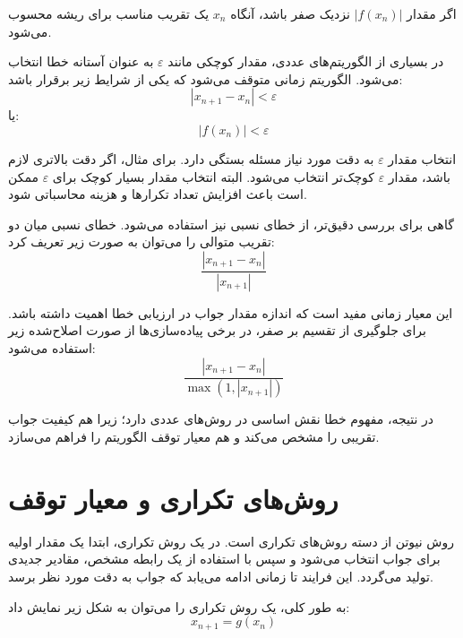 اگر مقدار $|f(x_n)|$ نزدیک صفر باشد، آنگاه $x_n$ یک تقریب مناسب برای ریشه محسوب می‌شود.

در بسیاری از الگوریتم‌های عددی، مقدار کوچکی مانند $\varepsilon$ به عنوان آستانه خطا انتخاب می‌شود. الگوریتم زمانی متوقف می‌شود که یکی از شرایط زیر برقرار باشد:
\begin{equation}
|x_{n+1}-x_n|<\varepsilon
\label{eq:ch2-stop-diff}
\end{equation}
یا:
\begin{equation}
|f(x_n)|<\varepsilon
\label{eq:ch2-stop-func}
\end{equation}

انتخاب مقدار $\varepsilon$ به دقت مورد نیاز مسئله بستگی دارد. برای مثال، اگر دقت بالاتری لازم باشد، مقدار $\varepsilon$ کوچک‌تر انتخاب می‌شود. البته انتخاب مقدار بسیار کوچک برای $\varepsilon$ ممکن است باعث افزایش تعداد تکرارها و هزینه محاسباتی شود.

گاهی برای بررسی دقیق‌تر، از خطای نسبی نیز استفاده می‌شود. خطای نسبی میان دو تقریب متوالی را می‌توان به صورت زیر تعریف کرد:
\begin{equation}
\frac{|x_{n+1}-x_n|}{|x_{n+1}|}
\label{eq:ch2-rel-error}
\end{equation}

این معیار زمانی مفید است که اندازه مقدار جواب در ارزیابی خطا اهمیت داشته باشد. برای جلوگیری از تقسیم بر صفر، در برخی پیاده‌سازی‌ها از صورت اصلاح‌شده زیر استفاده می‌شود:
\begin{equation}
\frac{|x_{n+1}-x_n|}{\max(1,|x_{n+1}|)}
\label{eq:ch2-rel-error-mod}
\end{equation}

در نتیجه، مفهوم خطا نقش اساسی در روش‌های عددی دارد؛ زیرا هم کیفیت جواب تقریبی را مشخص می‌کند و هم معیار توقف الگوریتم را فراهم می‌سازد.

\section{روش‌های تکراری و معیار توقف}

روش نیوتن از دسته روش‌های تکراری است. در یک روش تکراری، ابتدا یک مقدار اولیه برای جواب انتخاب می‌شود و سپس با استفاده از یک رابطه مشخص، مقادیر جدیدی تولید می‌گردد. این فرایند تا زمانی ادامه می‌یابد که جواب به دقت مورد نظر برسد.

به طور کلی، یک روش تکراری را می‌توان به شکل زیر نمایش داد:
\begin{equation}
x_{n+1}=g(x_n)
\label{eq:ch2-iteration}
\end{equation}

